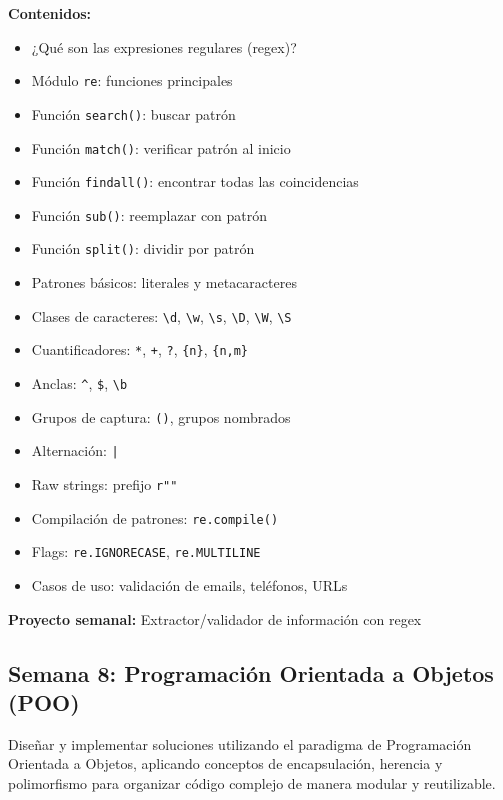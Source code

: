 \documentclass[12pt,letterpaper]{article}
\begin{document}
\textbf{Contenidos:}
\begin{itemize}[leftmargin=*]
    \item ¿Qué son las expresiones regulares (regex)?
    \item Módulo \texttt{re}: funciones principales
    \item Función \texttt{search()}: buscar patrón
    \item Función \texttt{match()}: verificar patrón al inicio
    \item Función \texttt{findall()}: encontrar todas las coincidencias
    \item Función \texttt{sub()}: reemplazar con patrón
    \item Función \texttt{split()}: dividir por patrón
    \item Patrones básicos: literales y metacaracteres
    \item Clases de caracteres: \texttt{\textbackslash d}, \texttt{\textbackslash w}, \texttt{\textbackslash s}, \texttt{\textbackslash D}, \texttt{\textbackslash W}, \texttt{\textbackslash S}
    \item Cuantificadores: \texttt{*}, \texttt{+}, \texttt{?}, \texttt{\{n\}}, \texttt{\{n,m\}}
    \item Anclas: \texttt{\^}, \texttt{\$}, \texttt{\textbackslash b}
    \item Grupos de captura: \texttt{()}, grupos nombrados
    \item Alternación: \texttt{|}
    \item Raw strings: prefijo \texttt{r""}
    \item Compilación de patrones: \texttt{re.compile()}
    \item Flags: \texttt{re.IGNORECASE}, \texttt{re.MULTILINE}
    \item Casos de uso: validación de emails, teléfonos, URLs
\end{itemize}

\textbf{Proyecto semanal:} Extractor/validador de información con regex

\subsection{Semana 8: Programación Orientada a Objetos (POO)}

\begin{objetivobox}
Diseñar y implementar soluciones utilizando el paradigma de Programación Orientada a Objetos, aplicando conceptos de encapsulación, herencia y polimorfismo para organizar código complejo de manera modular y reutilizable.
\end{objetivobox}
\end{document}
